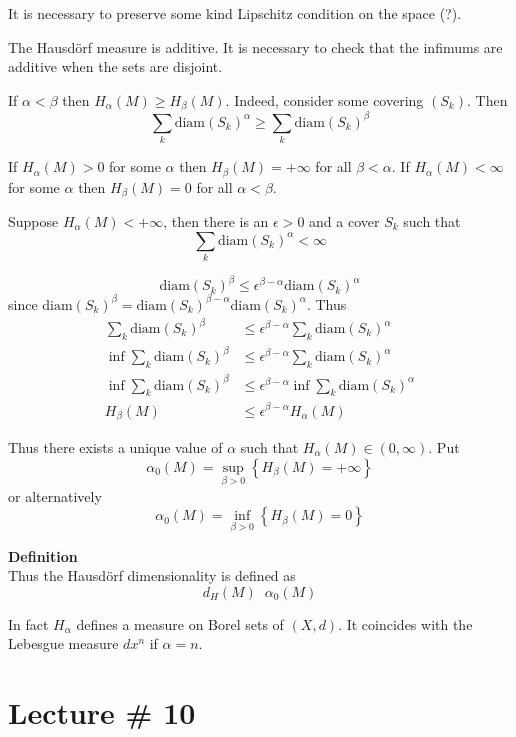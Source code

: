 \documentclass[a4paper]{article}
\newcommand{\obj}[1]{{\left\{ #1 \right \}}}
\newcommand{\brac}[1]{{\left ( #1 \right )}}
\newcommand{\defn}{\mathop{\overset{\Delta}{=}}\nolimits}
\begin{document}
It is necessary to preserve some kind Lipschitz condition on the space (?).

The Hausd\"orf measure is additive. It is necessary to check that
the infimums are additive when the sets are disjoint.

If $\alpha<\beta$ then $H_\alpha(M) \geq H_\beta(M)$.
Indeed, consider some covering $\brac{S_k}$. Then 
\[\sum_k \text{diam}(S_k)^\alpha \geq \sum_k \text{diam}(S_k)^\beta\]

If $H_\alpha(M) > 0$ for some $\alpha$ then $H_\beta(M) = +\infty$ for all $\beta<\alpha$.
If $H_\alpha(M) < \infty$ for some $\alpha$ then $H_\beta(M) = 0$ for all $\alpha<\beta$.

Suppose $H_\alpha(M) < +\infty$, then there is an $\epsilon>0$ and a cover $S_k$ such that 
\[\sum_k \text{diam}(S_k)^\alpha < \infty\]

\[\text{diam}(S_k)^\beta \leq \epsilon^{\beta-\alpha} \text{diam}(S_k)^\alpha \]
since $\text{diam}(S_k)^\beta = \text{diam}(S_k)^{\beta-\alpha}\text{diam}(S_k)^\alpha$.
Thus
\begin{align*}
	\sum_k \text{diam}(S_k)^\beta &\leq \epsilon^{\beta - \alpha} \sum_k \text{diam}(S_k)^\alpha\\
	\inf \sum_k \text{diam}(S_k)^\beta &\leq \epsilon^{\beta - \alpha} \sum_k \text{diam}(S_k)^\alpha\\
	\inf \sum_k \text{diam}(S_k)^\beta &\leq \epsilon^{\beta - \alpha} \inf \sum_k \text{diam}(S_k)^\alpha\\
	H_\beta(M) &\leq \epsilon^{\beta - \alpha} H_\alpha(M)
\end{align*}

Thus there exists a unique value of $\alpha$ such that $H_\alpha(M) \in (0,\infty)$. Put 
\[\alpha_0(M) = \sup_{\beta>0} \obj{ H_\beta(M) = +\infty }\]
or alternatively
\[\alpha_0(M) = \inf_{\beta>0} \obj{ H_\beta(M) = 0 }\]

\noindent\textbf{Definition}\hfill\\
Thus the Hausd\"orf dimensionality is defined as 
\[d_H(M) \defn \alpha_0(M)\]

In fact $H_\alpha$ defines a measure on Borel sets of $(X, d)$. It coincides with the Lebesgue measure $dx^n$ if $\alpha = n$.



\section{Lecture \# 10} %
\label{sec:lecture_10}
\end{document}
